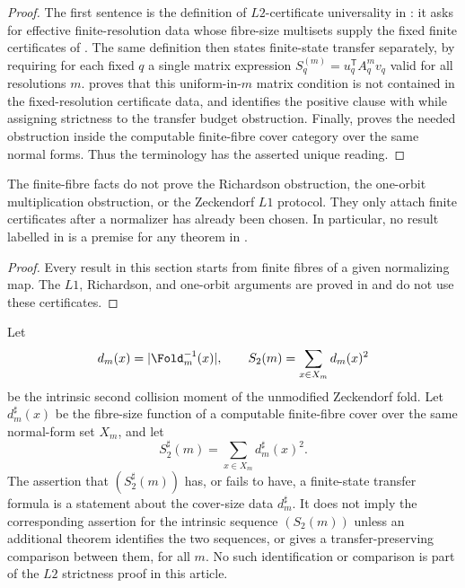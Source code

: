 \begin{proof}
The first sentence is the definition of \(L2\)-certificate universality in
: it asks for effective finite-resolution data whose
fibre-size multisets supply the fixed finite certificates of
.  The same definition then states
finite-state transfer separately, by requiring for each fixed \(q\) a single
matrix expression \(S_q^{(m)}=u_q^{\mathsf T}A_q^m v_q\) valid for all
resolutions \(m\).   proves that
this uniform-in-\(m\) matrix condition is not contained in the fixed-resolution
certificate data, and  identifies the positive clause
with  while assigning strictness to the transfer
budget obstruction.  Finally,
 proves the needed obstruction
inside the computable finite-fibre cover category over the same normal forms.
Thus the terminology has the asserted unique reading.
\end{proof}

\begin{corollary}
\label{cor:L2-subordinate-role}
The finite-fibre facts do not prove the Richardson obstruction, the one-orbit
multiplication obstruction, or the Zeckendorf \(L1\) protocol.  They only attach
finite certificates after a normalizer has already been chosen.  In particular,
no result labelled in  is a premise for any theorem in
.
\end{corollary}

\begin{proof}
Every result in this section starts from finite fibres of a given normalizing
map.  The \(L1\), Richardson, and one-orbit arguments are proved in
 and do not use these certificates.
\end{proof}

\begin{theorem}
\label{thm:L2-cover-intrinsic-nonimplication}
Let
\[
  d_m(x)=|\Fold_m^{-1}(x)|,
  \qquad S_2(m)=\sum_{x\in X_m}d_m(x)^2
\]
be the intrinsic second collision moment of the unmodified Zeckendorf fold.  Let
\(d_m^\sharp(x)\) be the fibre-size function of a computable finite-fibre cover
over the same normal-form set \(X_m\), and let
\[
  S_2^\sharp(m)=\sum_{x\in X_m}d_m^\sharp(x)^2 .
\]
The assertion that \((S_2^\sharp(m))\) has, or fails to have, a finite-state
transfer formula is a statement about the cover-size data \(d_m^\sharp\).  It
does not imply the corresponding assertion for the intrinsic sequence
\((S_2(m))\) unless an additional theorem identifies the two sequences, or gives
a transfer-preserving comparison between them, for all \(m\).  No such
identification or comparison is part of the \(L2\) strictness proof in this
article.
\end{theorem}

